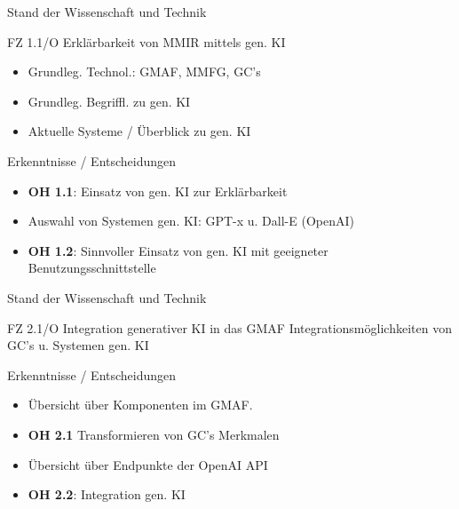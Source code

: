 \documentclass[t]{beamer}
\begin{document}
\begin{frame}{Stand der Wissenschaft und Technik}

  \begin{block}{FZ 1.1/O Erklärbarkeit von MMIR mittels gen. KI}
    \begin{itemize}
      \item Grundleg. Technol.: GMAF, MMFG, GC's
      \item Grundleg. Begriffl. zu gen. KI
      \item Aktuelle Systeme / Überblick zu gen. KI
    \end{itemize}
  \end{block}

  \begin{exampleblock}{Erkenntnisse / Entscheidungen}
    \begin{itemize}
      \item \textbf{OH 1.1}: Einsatz von gen. KI zur Erklärbarkeit
      \item Auswahl von Systemen gen. KI: GPT-x u. Dall-E (OpenAI)
      \item \textbf{OH 1.2}: Sinnvoller Einsatz von gen. KI mit geeigneter Benutzungsschnittstelle
    \end{itemize}
  \end{exampleblock}

\end{frame}

\begin{frame}{Stand der Wissenschaft und Technik}

  \begin{block}{FZ 2.1/O Integration generativer KI in das GMAF}
    Integrationsmöglichkeiten von GC's u. Systemen gen. KI
  \end{block}

  \begin{exampleblock}{Erkenntnisse / Entscheidungen}
    \begin{itemize}
      \item Übersicht über Komponenten im GMAF.
      \item \textbf{OH 2.1} Transformieren von GC's Merkmalen
      \item Übersicht über Endpunkte der OpenAI API
      \item \textbf{OH 2.2}: Integration gen. KI
    \end{itemize}
  \end{exampleblock}

\end{frame}
\end{document}
